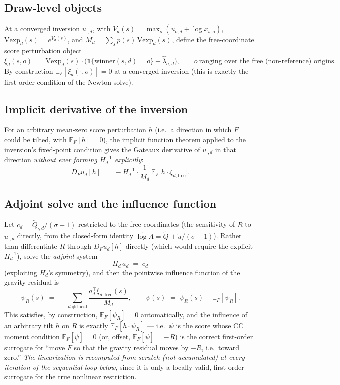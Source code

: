 \documentclass[11pt]{article}
\newcommand{\E}{\mathbb{E}}
\begin{document}
\subsection{Draw-level objects}
At a converged inversion $u_{\cdot,d}$, with $V_{\!d}(s)=\max_o(u_{o,d}+\log x_{s,o})$,
$\mathrm{Vexp}_d(s)=e^{V_d(s)}$, and $M_d=\sum_s p(s)\,\mathrm{Vexp}_d(s)$, define the free-coordinate
score perturbation object
\[
\xi_{d}(s,o) \;=\; \mathrm{Vexp}_d(s)\cdot\big(\mathbf{1}\{\text{winner}(s,d)=o\} - \hat\lambda_{o,d}\big),
\qquad o\ \text{ranging over the free (non-reference) origins.}
\]
By construction $\E_F[\xi_d(\cdot,o)]=0$ at a converged inversion (this is exactly the first-order
condition of the Newton solve).

\subsection{Implicit derivative of the inversion}
For an arbitrary mean-zero score perturbation $h$ (i.e.\ a direction in which $F$ could be tilted,
with $\E_F[h]=0$), the implicit function theorem applied to the inversion's fixed-point condition
gives the Gateaux derivative of $u_{\cdot,d}$ in that direction \emph{without ever forming
$H_d^{-1}$ explicitly}:
\[
D_F u_d[h] \;=\; -H_d^{-1}\cdot\frac{1}{M_d}\,\E_F\big[h\cdot\xi_{d,\text{free}}\big].
\]

\subsection{Adjoint solve and the influence function}
Let $c_d = \tilde Q_{\cdot,d}/(\sigma-1)$ restricted to the free coordinates (the sensitivity of $R$
to $u_{\cdot,d}$ directly, from the closed-form identity $\widetilde{\log A}=\tilde Q + \tilde u/(\sigma-1)$).
Rather than differentiate $R$ through $D_F u_d[h]$ directly (which would require the explicit
$H_d^{-1}$), solve the \emph{adjoint} system
\[
H_d\,a_d \;=\; c_d
\]
(exploiting $H_d$'s symmetry), and then the pointwise influence function of the gravity residual is
\[
\psi_R(s) \;=\; -\sum_{d\neq\text{focal}}\frac{a_d^\top \xi_{d,\text{free}}(s)}{M_d},
\qquad
\bar\psi(s) \;=\; \psi_R(s) - \E_F[\psi_R].
\]
This satisfies, by construction, $\E_F[\psi_R]=0$ automatically, and the influence of an arbitrary
tilt $h$ on $R$ is exactly $\E_F[h\cdot\psi_R]$ — i.e.\ $\bar\psi$ is the score whose CC moment
condition $\E_F[\bar\psi]=0$ (or, offset, $\E_F[\bar\psi]=-R$) is the correct first-order surrogate
for ``move $F$ so that the gravity residual moves by $-R$, i.e.\ toward zero.'' \emph{The
linearization is recomputed from scratch (not accumulated) at every iteration of the sequential
loop below}, since it is only a locally valid, first-order surrogate for the true nonlinear
restriction.
\end{document}
